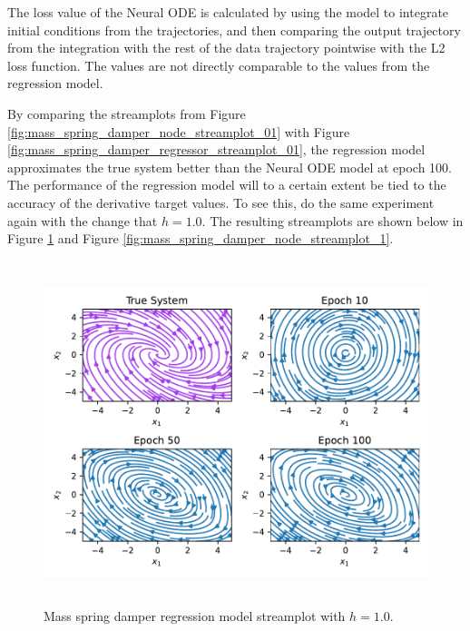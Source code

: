 \documentclass[12pt,a4paper]{book}
\begin{document}
The loss value of the Neural ODE is calculated by using the model to integrate initial conditions from the trajectories, and then comparing the output trajectory from the integration with the rest of the data trajectory pointwise with the L2 loss function. The values are not directly comparable to the values from the regression model.

By comparing the streamplots from Figure \ref{fig:mass_spring_damper_node_streamplot_01} with Figure \ref{fig:mass_spring_damper_regressor_streamplot_01}, the regression model approximates the true system better than the Neural ODE model at epoch 100. The performance of the regression model will to a certain extent be tied to the accuracy of the derivative target values. To see this, do the same experiment again with the change that $h = 1.0$. The resulting streamplots are shown below in Figure \ref{fig:mass_spring_damper_regressor_streamplot_1} and Figure \ref{fig:mass_spring_damper_node_streamplot_1}.

\begin{figure}[H]
    \centering
    \includegraphics[height=10cm]{figs/plots/basic_experiments/mass_spring_damper_regressor_streamplot_1.pdf}
    \caption{Mass spring damper regression model streamplot with $h = 1.0$.}
    \label{fig:mass_spring_damper_regressor_streamplot_1}
\end{figure}
\end{document}
